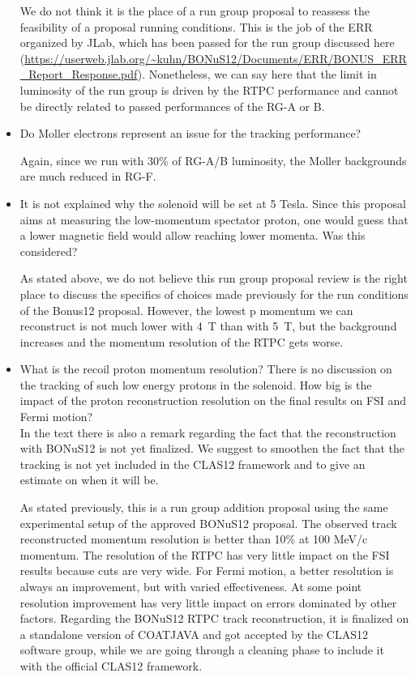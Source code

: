 \begin{itemize}
{\color{red} We do not think it is the place of a run group proposal to 
        reassess the feasibility of a proposal running conditions. This is the 
        job of the ERR organized by JLab, which has been passed for the run 
        group discussed here 
        (\url{https://userweb.jlab.org/~kuhn/BONuS12/Documents/ERR/BONUS_ERR_Report_Response.pdf}).  
        Nonetheless, we can say here that the limit in luminosity of the run 
        group is driven by the RTPC performance and cannot be directly related 
        to passed performances of the RG-A or B.}

 \item Do Moller electrons represent an issue for the tracking performance? 

 {\color{red} Again, since we run with 30\% of RG-A/B luminosity, the Moller 
        backgrounds are much reduced in RG-F.}

 \item It is not explained why the solenoid will be set at 5 Tesla. Since this 
    proposal aims at measuring the low-momentum spectator proton, one would 
        guess that a lower magnetic field would allow reaching lower momenta.  
        Was this considered?
 
{\color{red} As stated above, we do not believe this run group proposal review 
        is the right place to discuss the specifics of choices made previously 
        for the run conditions of the Bonus12 proposal. However, the lowest p 
        momentum we can reconstruct is not much lower with 4~T than with 5~T, 
        but the background increases and the momentum resolution of the RTPC 
        gets worse.}


\item What is the recoil proton momentum resolution? There is no discussion on 
   the tracking of such low energy protons in the solenoid. How big is the 
   impact of the proton reconstruction resolution on the final results on FSI 
   and Fermi motion?\\In the text there is also a remark regarding the fact 
   that the reconstruction with BONuS12 is not yet finalized. We suggest to 
   smoothen the fact that the tracking is not yet included in the CLAS12 
   framework and to give an estimate on when it will be.
 
{\color{red} As stated previously, this is a run group addition proposal using 
the same experimental setup of the approved BONuS12 proposal. The observed 
track reconstructed momentum resolution is better than 10\% at 100 MeV/c 
momentum. The resolution of the RTPC has very little impact on the FSI results 
because cuts are very wide. For Fermi motion, a better resolution is always an 
improvement, but with varied effectiveness. At some point resolution 
improvement has very little impact on errors dominated by other factors.  
Regarding the BONuS12 RTPC track reconstruction, it is finalized on a 
standalone version of COATJAVA and got accepted by the CLAS12 software group, 
while we are going through a cleaning phase to include it with the official 
CLAS12 framework.}


\end{itemize}
